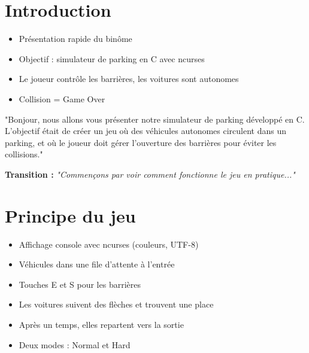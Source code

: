\documentclass[11pt,a4paper]{article}
\begin{document}
\vspace{0.5cm}

\section{Introduction}

\begin{timingbox}[30 secondes]
\end{timingbox}

\begin{ideesbox}
\begin{itemize}[noitemsep]
    \item Présentation rapide du binôme
    \item Objectif : simulateur de parking en C avec ncurses
    \item Le joueur contrôle les barrières, les voitures sont autonomes
    \item Collision = Game Over
\end{itemize}
\end{ideesbox}

\begin{phrasebox}
"Bonjour, nous allons vous présenter notre simulateur de parking développé en C. L'objectif était de créer un jeu où des véhicules autonomes circulent dans un parking, et où le joueur doit gérer l'ouverture des barrières pour éviter les collisions."
\end{phrasebox}

\textbf{Transition :} \textit{"Commençons par voir comment fonctionne le jeu en pratique..."}

\section{Principe du jeu}

\begin{timingbox}[1 minute]
\end{timingbox}

\begin{ideesbox}
\begin{itemize}[noitemsep]
    \item Affichage console avec ncurses (couleurs, UTF-8)
    \item Véhicules dans une file d'attente à l'entrée
    \item Touches E et S pour les barrières
    \item Les voitures suivent des flèches et trouvent une place
    \item Après un temps, elles repartent vers la sortie
    \item Deux modes : Normal et Hard
\end{itemize}
\end{ideesbox}
\end{document}
